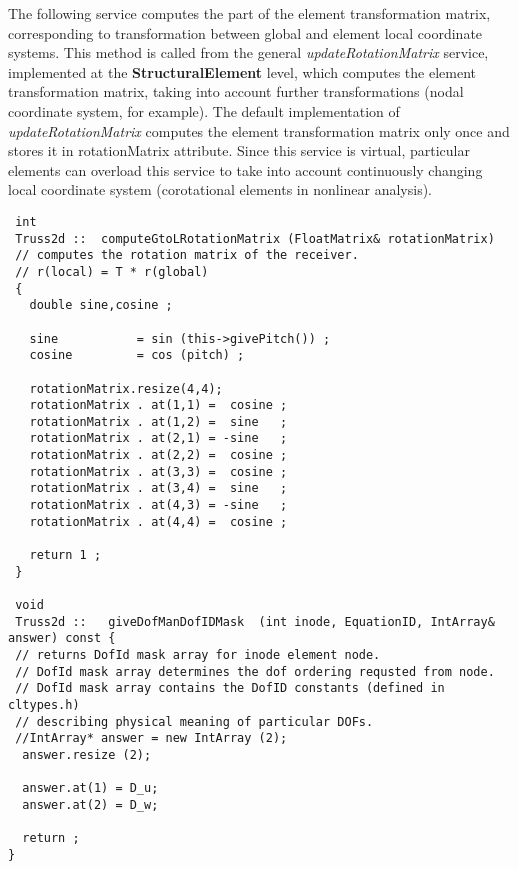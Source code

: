 \documentclass[12pt,draft]{article}
\newcommand{\class}[1]{{\bf #1}}
\newcommand{\service}[1]{{\em #1}}
\newcommand{\attribute}[1]{#1}
\begin{document}
 The following service computes the part of the element transformation
 matrix, corresponding to transformation between global  and element
 local coordinate systems. This method is called from
 the general \service{updateRotationMatrix} service, implemented at
 the \class{StructuralElement} level, which computes the element
 transformation matrix, taking into account further transformations
 (nodal coordinate system, for example). The default implementation of
 \service{updateRotationMatrix} computes the element transformation
 matrix only once and stores it in \attribute{rotationMatrix}
 attribute. Since this service is virtual, particular elements can
 overload this service to take into account continuously changing local
 coordinate system (corotational elements in nonlinear analysis).
 \begin{verbatim}
 int
 Truss2d ::  computeGtoLRotationMatrix (FloatMatrix& rotationMatrix) 
 // computes the rotation matrix of the receiver.
 // r(local) = T * r(global)
 {
   double sine,cosine ;

   sine           = sin (this->givePitch()) ;
   cosine         = cos (pitch) ;

   rotationMatrix.resize(4,4);
   rotationMatrix . at(1,1) =  cosine ;
   rotationMatrix . at(1,2) =  sine   ;
   rotationMatrix . at(2,1) = -sine   ;
   rotationMatrix . at(2,2) =  cosine ;
   rotationMatrix . at(3,3) =  cosine ;
   rotationMatrix . at(3,4) =  sine   ;
   rotationMatrix . at(4,3) = -sine   ;
   rotationMatrix . at(4,4) =  cosine ;

   return 1 ;
 }

 void
 Truss2d ::   giveDofManDofIDMask  (int inode, EquationID, IntArray& answer) const {
 // returns DofId mask array for inode element node.
 // DofId mask array determines the dof ordering requsted from node.
 // DofId mask array contains the DofID constants (defined in cltypes.h)
 // describing physical meaning of particular DOFs.
 //IntArray* answer = new IntArray (2);
  answer.resize (2);

  answer.at(1) = D_u;
  answer.at(2) = D_w;

  return ;
}


 \end{verbatim}
\end{document}
